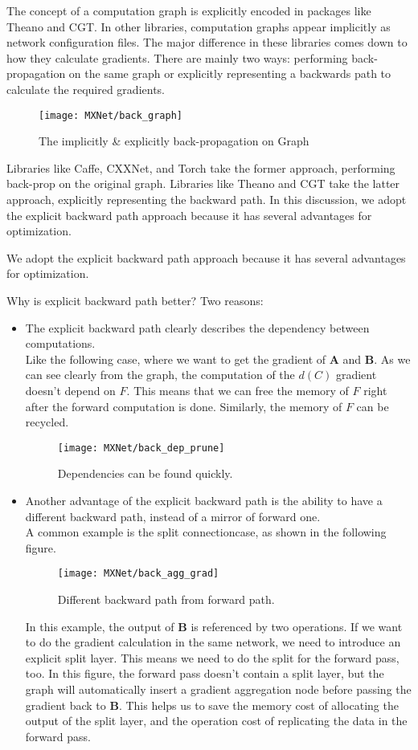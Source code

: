 The concept of a computation graph is explicitly encoded in packages like Theano and CGT. In other libraries, computation graphs appear implicitly as network configuration files. The major difference in these libraries comes down to how they calculate gradients. There are mainly two ways: performing back-propagation on the same graph or explicitly representing a backwards path to calculate the required gradients.

\begin{figure}[!hbtp]
\centering
\texttt{[image: MXNet/back\_graph]}
\caption{The implicitly \& explicitly back-propagation on Graph}
\end{figure}

Libraries like Caffe, CXXNet, and Torch take the former approach, performing back-prop on the original graph. Libraries like Theano and CGT take the latter approach, explicitly representing the backward path. In this discussion, we adopt the explicit backward path approach because it has several advantages for optimization.

We adopt the explicit backward path approach because it has several advantages for optimization.

Why is explicit backward path better? Two reasons:
\begin{itemize}
\item The explicit backward path clearly describes the dependency between computations.\\
Like the following case, where we want to get the gradient of \textbf{A} and \textbf{B}. As we can see clearly from the graph, the computation of the $d(C)$ gradient doesn’t depend on $F$. This means that we can free the memory of $F$ right after the forward computation is done. Similarly, the memory of $F$ can be recycled.
\begin{figure}[!hbtp]
\centering
\texttt{[image: MXNet/back\_dep\_prune]}
\caption{Dependencies can be found quickly.}
\end{figure}

\item Another advantage of the explicit backward path is the ability to have a different backward path, instead of a mirror of forward one.\\
A common example is the split connectioncase, as shown in the following figure.
\begin{figure}[!hbtp]
\centering
\texttt{[image: MXNet/back\_agg\_grad]}
\caption{Different backward path from forward path.}
\end{figure}
In this example, the output of \textbf{B} is referenced by two operations. If we want to do the gradient calculation in the same network, we need to introduce an explicit split layer. This means we need to do the split for the forward pass, too. In this figure, the forward pass doesn’t contain a split layer, but the graph will automatically insert a gradient aggregation node before passing the gradient back to \textbf{B}. This helps us to save the memory cost of allocating the output of the split layer, and the operation cost of replicating the data in the forward pass.
\end{itemize}

